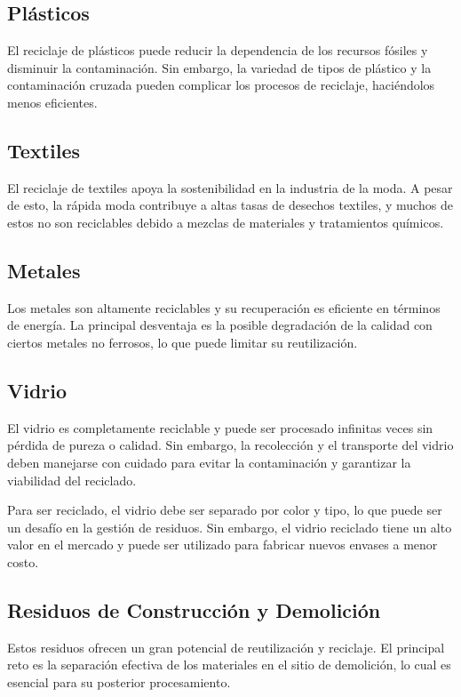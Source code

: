\subsection{Plásticos}
El reciclaje de plásticos puede reducir la dependencia de los recursos fósiles y disminuir la contaminación. Sin embargo, la variedad de tipos de plástico y la contaminación cruzada pueden complicar los procesos de reciclaje, haciéndolos menos eficientes.

\subsection{Textiles}
El reciclaje de textiles apoya la sostenibilidad en la industria de la moda. A pesar de esto, la rápida moda contribuye a altas tasas de desechos textiles, y muchos de estos no son reciclables debido a mezclas de materiales y tratamientos químicos.

\subsection{Metales}
Los metales son altamente reciclables y su recuperación es eficiente en términos de energía. La principal desventaja es la posible degradación de la calidad con ciertos metales no ferrosos, lo que puede limitar su reutilización.

\subsection{Vidrio}
El vidrio es completamente reciclable y puede ser procesado infinitas veces sin pérdida de pureza o calidad. Sin embargo, la recolección y el transporte del vidrio deben manejarse con cuidado para evitar la contaminación y garantizar la viabilidad del reciclado.

Para ser reciclado, el vidrio debe ser separado por color y tipo, lo que puede ser un desafío en la gestión de residuos. Sin embargo, el vidrio reciclado tiene un alto valor en el mercado y puede ser utilizado para fabricar nuevos envases a menor costo.

\subsection{Residuos de Construcción y Demolición}
Estos residuos ofrecen un gran potencial de reutilización y reciclaje. El principal reto es la separación efectiva de los materiales en el sitio de demolición, lo cual es esencial para su posterior procesamiento.

